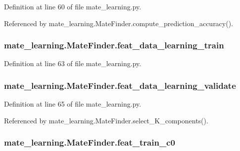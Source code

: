 Definition at line 60 of file mate\+\_\+learning.\+py.



Referenced by mate\+\_\+learning.\+Mate\+Finder.\+compute\+\_\+prediction\+\_\+accuracy().

\hypertarget{classmate__learning_1_1_mate_finder_a04fe666220e1331ae3c444f3e8f6e3d3}{
\subsubsection[{feat\+\_\+data\+\_\+learning\+\_\+train}]{\setlength{\rightskip}{0pt plus 5cm}mate\+\_\+learning.\+Mate\+Finder.\+feat\+\_\+data\+\_\+learning\+\_\+train}}\label{classmate__learning_1_1_mate_finder_a04fe666220e1331ae3c444f3e8f6e3d3}


Definition at line 63 of file mate\+\_\+learning.\+py.

\hypertarget{classmate__learning_1_1_mate_finder_a52a62e61246856c4d2e613a29ed86a8d}{
\subsubsection[{feat\+\_\+data\+\_\+learning\+\_\+validate}]{\setlength{\rightskip}{0pt plus 5cm}mate\+\_\+learning.\+Mate\+Finder.\+feat\+\_\+data\+\_\+learning\+\_\+validate}}\label{classmate__learning_1_1_mate_finder_a52a62e61246856c4d2e613a29ed86a8d}


Definition at line 65 of file mate\+\_\+learning.\+py.



Referenced by mate\+\_\+learning.\+Mate\+Finder.\+select\+\_\+\+K\+\_\+components().

\hypertarget{classmate__learning_1_1_mate_finder_a3577286991dc86227a3275cefd8d02af}{
\subsubsection[{feat\+\_\+train\+\_\+c0}]{\setlength{\rightskip}{0pt plus 5cm}mate\+\_\+learning.\+Mate\+Finder.\+feat\+\_\+train\+\_\+c0}}\label{classmate__learning_1_1_mate_finder_a3577286991dc86227a3275cefd8d02af}


